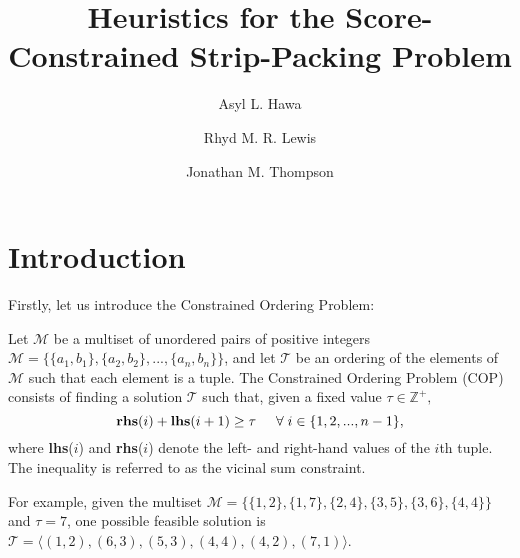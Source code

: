 \documentclass[oribibl]{llncs}
\begin{document}
\title{Heuristics for the Score-Constrained Strip-Packing Problem}
\author{Asyl L. Hawa \and Rhyd M. R. Lewis \and Jonathan M. Thompson}

\maketitle

\begin{abstract}
	
\end{abstract}

\section{Introduction}
\label{sec:intro}

Firstly, let us introduce the Constrained Ordering Problem:

\begin{definition}
	\label{defn:cpop}
	Let $\mathcal{M}$ be a multiset of unordered pairs of positive integers $\mathcal{M} = \{\{a_1, b_1\}, \{a_2,b_2\},...,\{a_n,b_n\}\}$, and let $\mathcal{T}$ be an ordering of the elements of $\mathcal{M}$ such that each element is a tuple. The Constrained Ordering Problem (COP) consists of finding a solution $\mathcal{T}$ such that, given a fixed value $\tau \in \mathbb{Z}^{+},$
	\begin{equation}
		\label{eqn:cpop}
		\textup{\textbf{rhs}}(i) + \textup{\textbf{lhs}}(i+1) \geq \tau \hspace{5mm} \forall \hspace{1mm} i \in \{1,2,..., n-1\},
	\end{equation}
	where \textup{\textbf{lhs}($i$)} and \textup{\textbf{rhs}($i$)} denote the left- and right-hand values of the $i$th tuple. The inequality is referred to as the \textup{vicinal sum constraint}.
\end{definition}

For example, given the multiset $\mathcal{M} = \{\{1,2\}, \{1,7\}, \{2,4\}, \{3,5\}, \{3,6\}, \{4,4\}\}$ and $\tau = 7$, one possible feasible solution is $\mathcal{T} = \langle(1,2), (6,3), (5,3), (4,4), (4,2), (7,1) \rangle$.
\end{document}
